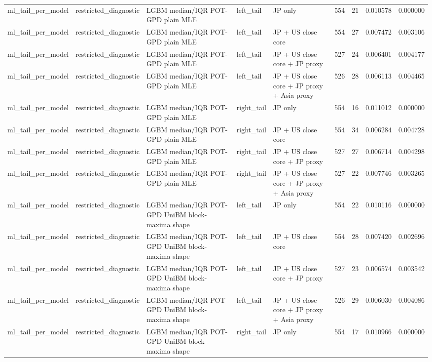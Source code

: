 \begin{tabular}{lllllrrrr}
ml\_tail\_per\_model & restricted\_diagnostic & LGBM median/IQR POT-GPD plain MLE & left\_tail & JP only & 554 & 21 & 0.010578 & 0.000000 \\
ml\_tail\_per\_model & restricted\_diagnostic & LGBM median/IQR POT-GPD plain MLE & left\_tail & JP + US close core & 554 & 27 & 0.007472 & 0.003106 \\
ml\_tail\_per\_model & restricted\_diagnostic & LGBM median/IQR POT-GPD plain MLE & left\_tail & JP + US close core + JP proxy & 527 & 24 & 0.006401 & 0.004177 \\
ml\_tail\_per\_model & restricted\_diagnostic & LGBM median/IQR POT-GPD plain MLE & left\_tail & JP + US close core + JP proxy + Asia proxy & 526 & 28 & 0.006113 & 0.004465 \\
ml\_tail\_per\_model & restricted\_diagnostic & LGBM median/IQR POT-GPD plain MLE & right\_tail & JP only & 554 & 16 & 0.011012 & 0.000000 \\
ml\_tail\_per\_model & restricted\_diagnostic & LGBM median/IQR POT-GPD plain MLE & right\_tail & JP + US close core & 554 & 34 & 0.006284 & 0.004728 \\
ml\_tail\_per\_model & restricted\_diagnostic & LGBM median/IQR POT-GPD plain MLE & right\_tail & JP + US close core + JP proxy & 527 & 27 & 0.006714 & 0.004298 \\
ml\_tail\_per\_model & restricted\_diagnostic & LGBM median/IQR POT-GPD plain MLE & right\_tail & JP + US close core + JP proxy + Asia proxy & 527 & 22 & 0.007746 & 0.003265 \\
ml\_tail\_per\_model & restricted\_diagnostic & LGBM median/IQR POT-GPD UniBM block-maxima shape & left\_tail & JP only & 554 & 22 & 0.010116 & 0.000000 \\
ml\_tail\_per\_model & restricted\_diagnostic & LGBM median/IQR POT-GPD UniBM block-maxima shape & left\_tail & JP + US close core & 554 & 28 & 0.007420 & 0.002696 \\
ml\_tail\_per\_model & restricted\_diagnostic & LGBM median/IQR POT-GPD UniBM block-maxima shape & left\_tail & JP + US close core + JP proxy & 527 & 23 & 0.006574 & 0.003542 \\
ml\_tail\_per\_model & restricted\_diagnostic & LGBM median/IQR POT-GPD UniBM block-maxima shape & left\_tail & JP + US close core + JP proxy + Asia proxy & 526 & 29 & 0.006030 & 0.004086 \\
ml\_tail\_per\_model & restricted\_diagnostic & LGBM median/IQR POT-GPD UniBM block-maxima shape & right\_tail & JP only & 554 & 17 & 0.010966 & 0.000000 \\

\end{tabular}
